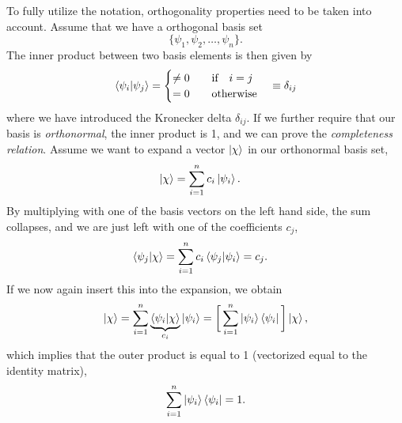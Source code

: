 To fully utilize the notation, orthogonality properties need to be taken into account. Assume that we have a orthogonal basis set 
\begin{equation}
\{\psi_1,\psi_2,\hdots,\psi_n\}.
\end{equation}
The inner product between two basis elements is then given by
\begin{equation}
\braket{\psi_i}{\psi_j}=
\begin{cases}
\neq 0\quad&\text{if}\quad i=j\\
=0\quad&\text{otherwise}
\end{cases}
\quad\equiv\delta_{ij}
\end{equation}
where we have introduced the Kronecker delta $\delta_{ij}$. If we further require that our basis is \textit{orthonormal}, the inner product is 1, and we can prove the \textit{completeness relation}. Assume we want to expand a vector $\ket{\chi}$ in our orthonormal basis set,
\begin{align}
\ket{\chi}&=\sum_{i=1}^nc_i\ket{\psi_i}.
\end{align}
By multiplying with one of the basis vectors on the left hand side, the sum collapses, and we are just left with one of the coefficients $c_j$,
\begin{align}
\braket{\psi_j}{\chi} &= \sum_{i=1}^nc_i\braket{\psi_j}{\psi_i}=c_j.
\end{align}
If we now again insert this into the expansion, we obtain
\begin{equation}
\ket{\chi}=\sum_{i=1}^n\underbrace{\braket{\psi_i}{\chi}}_{c_i}\ket{\psi_i}=\bigg[\sum_{i=1}^n\ket{\psi_i}\bra{\psi_i}\bigg]\ket{\chi},
\end{equation}
which implies that the outer product is equal to 1 (vectorized equal to the identity matrix),
\begin{equation}
\sum_{i=1}^n\ket{\psi_i}\bra{\psi_i}=1.
\end{equation}


